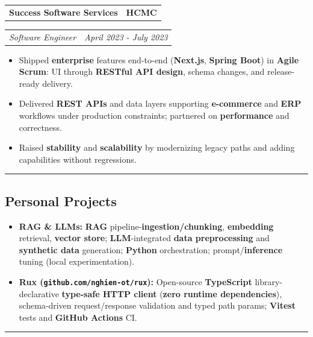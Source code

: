\documentclass[10pt,letterpaper]{article}
\makeatletter
\newcommand{\headerrow}[2]
{\begin{tabular*}{\linewidth}{l@{\extracolsep{\fill}}r}
#1 &
#2 \\
\end{tabular*}}
\newcommand{\resumesectionrule}{%
  \par\vspace{0.18em}%
  \noindent\rule{\linewidth}{0.4pt}\par
  \vspace{0.24em}%
}
\makeatother
\begin{document}
\headerrow
{\large\textbf{Success Software Services}}
{\textbf{HCMC}}
\headerrow
{\emph{Software Engineer}}
{\emph{April 2023 - July 2023}}
\begin{itemize}
      \item Shipped \textbf{enterprise} features end-to-end (\textbf{Next.js}, \textbf{Spring Boot}) in \textbf{Agile Scrum}: UI through \textbf{RESTful API design}, schema changes, and release-ready delivery.
      \item Delivered \textbf{REST APIs} and data layers supporting \textbf{e-commerce} and \textbf{ERP} workflows under production constraints; partnered on \textbf{performance} and correctness.
      \item Raised \textbf{stability} and \textbf{scalability} by modernizing legacy paths and adding capabilities without regressions.
\end{itemize}
\resumesectionrule
\subsection*{\Large Personal Projects}
\begin{itemize}
      \item \textbf{RAG \& LLMs:} \textbf{RAG} pipeline-\textbf{ingestion/chunking}, \textbf{embedding} retrieval, \textbf{vector store}; \textbf{LLM}-integrated \textbf{data preprocessing} and \textbf{synthetic data} generation; \textbf{Python} orchestration; prompt/\textbf{inference} tuning (local experimentation).
      \item \textbf{Rux (\texttt{github.com/nghien-ot/rux}):} Open-source \textbf{TypeScript} library-declarative \textbf{type-safe HTTP client} (\textbf{zero runtime dependencies}), schema-driven request/response validation and typed path params; \textbf{Vitest} tests and \textbf{GitHub Actions} CI.
\end{itemize}
\resumesectionrule
\end{document}
